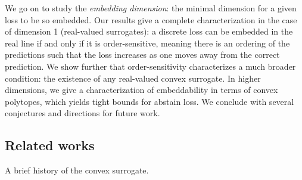 \documentclass[anon,12pt]{colt2019}
\begin{document}
We go on to study the \emph{embedding dimension}: the minimal dimension for a given loss to be so embedded.
Our results give a complete characterization in the case of dimension 1 (real-valued surrogates):
a discrete loss can be embedded in the real line if and only if it is order-sensitive, meaning there is an ordering of the predictions such that the loss increases as one moves away from the correct prediction.
We show further that order-sensitivity characterizes a much broader condition: the existence of any real-valued convex surrogate.
In higher dimensions, we give a characterization of embeddability in terms of convex polytopes, which yields tight bounds for abstain loss.
We conclude with several conjectures and directions for future work.

\subsection{Related works}
A brief history of the convex surrogate.
\end{document}
